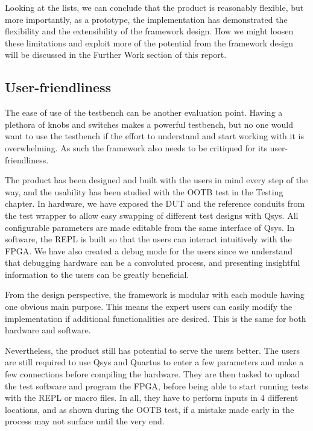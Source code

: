 Looking at the lists, we can conclude that the product is reasonably flexible, but more importantly, as a prototype, the implementation has demonstrated the flexibility and the extensibility of the framework design.
How we might loosen these limitations and exploit more of the potential from the framework design will be discussed in the Further Work section of this report.

\subsection{User-friendliness}
The ease of use of the testbench can be another evaluation point.
Having a plethora of knobs and switches makes a powerful testbench, but no one would want to use the testbench if the effort to understand and start working with it is overwhelming.
As such the framework also needs to be critiqued for its user-friendliness.

The product has been designed and built with the users in mind every step of the way, and the usability has been studied with the OOTB test in the Testing chapter.
In hardware, we have exposed the DUT and the reference conduits from the test wrapper to allow easy swapping of different test designs with Qsys.
All configurable parameters are made editable from the same interface of Qsys.
In software, the REPL is built so that the users can interact intuitively with the FPGA.
We have also created a debug mode for the users since we understand that debugging hardware can be a convoluted process, and presenting insightful information to the users can be greatly beneficial.

From the design perspective, the framework is modular with each module having one obvious main purpose.
This means the expert users can easily modify the implementation if additional functionalities are desired.
This is the same for both hardware and software.

Nevertheless, the product still has potential to serve the users better.
The users are still required to use Qsys and Quartus to enter a few parameters and make a few connections before compiling the hardware.
They are then tasked to upload the test software and program the FPGA, before being able to start running tests with the REPL or macro files.
In all, they have to perform inputs in 4 different locations, and as shown during the OOTB test, if a mistake made early in the process may not surface until the very end.

